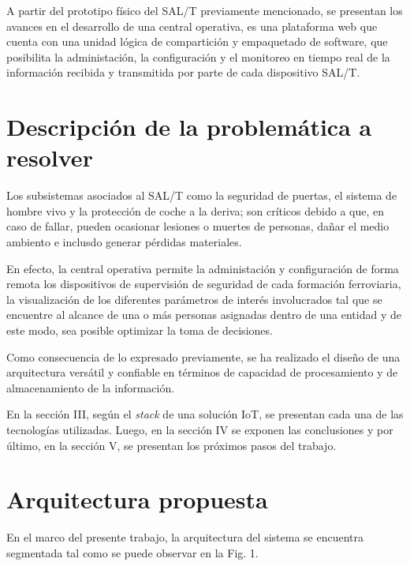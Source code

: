 \documentclass[10pt, a4paper, twocolumn]{article} %
\begin{document}
A partir del prototipo físico del SAL/T previamente mencionado, se presentan los avances en el desarrollo de una central operativa, es una plataforma web que cuenta con una unidad lógica de compartición y empaquetado de software, que posibilita la administación, la configuración y el monitoreo en tiempo real de la información recibida y transmitida por parte de cada dispositivo SAL/T.

\section{Descripción de la problemática a resolver}

Los subsistemas asociados al SAL/T como la seguridad de puertas, el sistema de hombre vivo y la protección de coche a la deriva; son críticos debido a que, en caso de fallar, pueden ocasionar lesiones o muertes de personas, dañar el medio ambiento e inclusdo generar pérdidas materiales. 

En efecto, la central operativa permite la administación y configuración de forma remota los dispositivos de supervisión de seguridad de cada formación ferroviaria, la visualización de los diferentes parámetros de interés involucrados tal que se encuentre al alcance de una o más personas asignadas dentro de una entidad y de este modo, sea posible optimizar la toma de decisiones.

Como consecuencia de lo expresado previamente, se ha realizado el diseño de una arquitectura versátil y confiable en términos de capacidad de procesamiento y de almacenamiento de la información.

En la sección III, según el \textit{stack} de una solución IoT, se presentan cada una de las tecnologías utilizadas. Luego, en la sección IV se exponen las conclusiones y por último, en la sección V, se presentan los próximos pasos del trabajo.


\section{Arquitectura propuesta}

En el marco del presente trabajo, la arquitectura del sistema se encuentra segmentada tal como se puede observar en la Fig. 1.


\subsection{}

\subsection{}
\end{document}
